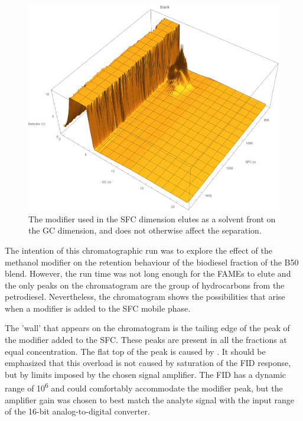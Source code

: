 \begin{figure}
	\centering
	\includegraphics[width=\textwidth]{Figures/Modifier.pdf}
	\decoRule	
	
	\caption[Modifiers in SFC]{The modifier used in the SFC dimension elutes as a
solvent front on the GC dimension, and does not otherwise affect the separation.}
	
	\label{fig:Modifier} 
\end{figure}

The intention of this chromatographic run was to explore the effect of the
meth\-anol modifier on the retention behaviour of the biodiesel fraction of the
B50 blend. However, the run time was not long enough for the FAMEs to elute and
the only peaks on the chromatogram are the group of hydrocarbons from the
petrodiesel. Nevertheless, the chromatogram shows the possibilities that arise
when a modifier is added to the SFC mobile phase.

The 'wall' that appears on the chromatogram is the tailing edge of the peak of
the modifier added to the SFC. These peaks are present in all the fractions at
equal concentration. The flat top of the peak is caused by . It should be emphasized that this overload is not caused by
saturation of the FID response, but by limits imposed by the chosen signal
amplifier. The FID has a dynamic range of 10\textsuperscript{6} and could
comfortably accommodate the modifier peak, but the amplifier gain was chosen to
best match the analyte signal with the input range of the 16-bit
analog-to-digital converter.

